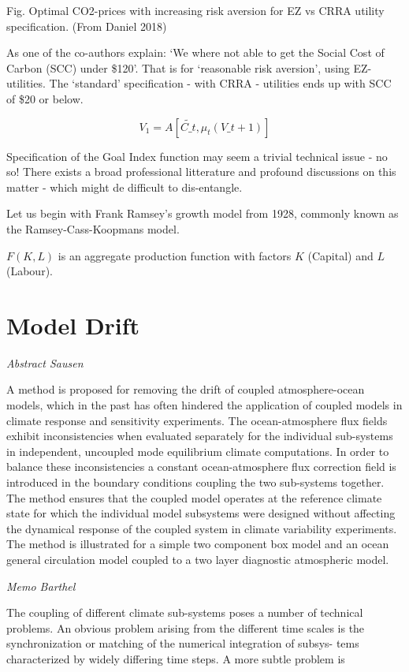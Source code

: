\documentclass[
]{book}
\begin{document}
Fig. Optimal CO2-prices with increasing risk aversion for EZ vs CRRA utility specification. (From Daniel 2018)

As one of the co-authors explain: `We where not able to get the Social
Cost of Carbon (SCC) under \$120'.
That is for `reasonable risk aversion', using EZ-utilities.
The `standard' specification - with CRRA - utilities ends up with SCC
of \$20 or below.

\[V_1 = A [\tilde{C\_t}, \mu_t(V\_{t+1})]\]

Specification of the Goal Index function may seem a trivial technical issue -
no so!
There exists a broad professional litterature and profound discussions on
this matter -
which might de difficult to dis-entangle.

Let us begin with Frank Ramsey's growth model from 1928, commonly known
as the Ramsey-Cass-Koopmans model.

\(F(K,L)\) is an aggregate production function with factors \(K\) (Capital) and
\(L\) (Labour).

\hypertarget{model-drift}{%
\section{Model Drift}\label{model-drift}}

\emph{Abstract Sausen}

A method is proposed for removing the
drift of coupled atmosphere-ocean models, which
in the past has often hindered the application of
coupled models in climate response and sensitivity experiments.
The ocean-atmosphere flux fields
exhibit inconsistencies when evaluated separately
for the individual sub-systems in independent,
uncoupled mode equilibrium climate computations.
In order to balance these inconsistencies a
constant ocean-atmosphere flux correction field is
introduced in the boundary conditions coupling
the two sub-systems together. The method ensures
that the coupled model operates at the reference
climate state for which the individual model subsystems
were designed without affecting the dynamical response of the coupled system in climate
variability experiments. The method is illustrated
for a simple two component box model and an
ocean general circulation model coupled to a two
layer diagnostic atmospheric model.

\emph{Memo Barthel}

The coupling of different climate sub-systems poses a number of technical
problems. An obvious problem arising from the
different time scales is the synchronization or
matching of the numerical integration of subsys-
tems characterized by widely differing time steps.
A more subtle problem is
\end{document}
